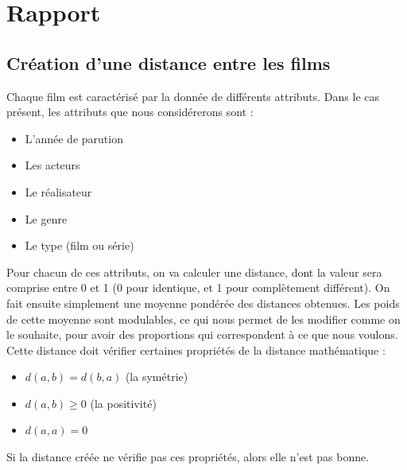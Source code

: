 \documentclass{report}
\begin{document}
\chapter{Rapport}



\section{Création d'une distance entre les films}
Chaque film est caractérisé par la donnée de différents attributs. Dans le cas présent, les attributs que nous considérerons sont :
\begin{itemize}
    \item L'année de parution
    \item Les acteurs
    \item Le réalisateur
    \item Le genre
    \item Le type (film ou série)
\end{itemize}
Pour chacun de ces attributs, on va calculer une distance, dont la valeur sera comprise entre 0 et 1 (0 pour identique, et 1 pour complètement différent). On fait ensuite simplement une moyenne pondérée des distances obtenues. Les poids de cette moyenne sont modulables, ce qui nous permet de les modifier comme on le souhaite, pour avoir des proportions qui correspondent à ce que nous voulons.\\
Cette distance doit vérifier certaines propriétés de la distance mathématique :
\begin{itemize}
    \item \(d(a,b)=d(b,a)\) (la symétrie)
    \item \(d(a,b) \geq 0\) (la positivité)
    \item \(d(a,a)=0\)
\end{itemize}
Si la distance créée ne vérifie pas ces propriétés, alors elle n'est pas bonne.
\end{document}
